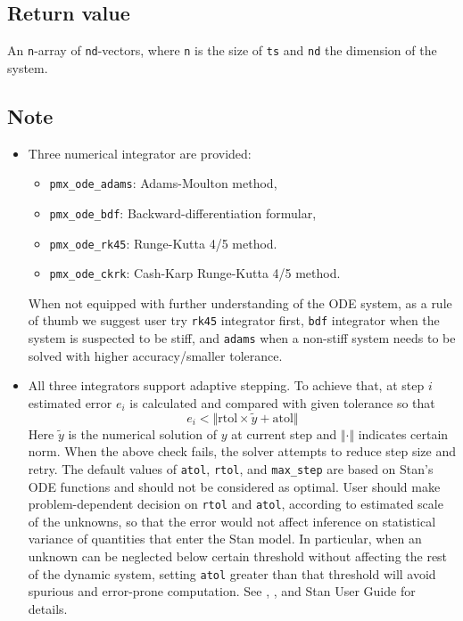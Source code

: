 \documentclass[12pt, reqno, oneside]{amsbook}
\numberwithin{equation}{chapter}
\numberwithin{figure}{chapter}
\numberwithin{table}{chapter}
\theoremstyle{remark}
\begin{document}
\subsection{Return value}
\label{sec:org0bffd09}
An \texttt{n}-array of \texttt{nd}-vectors, where \texttt{n} is the size of \texttt{ts}
and \texttt{nd} the dimension of the system.
\subsection{Note}
\label{sec:orgf701db1}
\begin{itemize}
\item Three numerical integrator are provided:
\begin{itemize}
\item \texttt{pmx\_ode\_adams}: Adams-Moulton method,
\item \texttt{pmx\_ode\_bdf}: Backward-differentiation formular,
\item \texttt{pmx\_ode\_rk45}: Runge-Kutta 4/5 method.
\item \texttt{pmx\_ode\_ckrk}: Cash-Karp Runge-Kutta 4/5 method.
\end{itemize}
When not equipped with further understanding of the ODE system, as a
rule of thumb we suggest user try
\texttt{rk45} integrator first, \texttt{bdf}
integrator when the system is suspected to be stiff, and
\texttt{adams} when a non-stiff system needs to be solved
with higher accuracy/smaller tolerance.

\item All three integrators support adaptive stepping. To achieve
that, at step \(i\) estimated error \(e_i\) is calculated and
compared with given tolerance so that
\begin{equation}
  e_i < \Vert\text{rtol} \times \tilde{y} + \text{atol}\Vert
\end{equation}
Here \(\tilde{y}\) is the numerical solution of \(y\) at current
step and \(\Vert \cdot \Vert\) indicates certain norm. When the above check fails, the solver attempts
to reduce step size and retry. The default values of \texttt{atol},
\texttt{rtol}, and \texttt{max\_step} are
based on Stan's ODE functions and should not be considered as
optimal. User should make problem-dependent
decision on \texttt{rtol} and \texttt{atol},
according to estimated scale of the unknowns, so that the error
would not affect inference on statistical variance of quantities
that enter the Stan model. In particular, when an unknown can be neglected
below certain threshold without affecting the rest of
the dynamic system, setting
\texttt{atol} greater than that threshold will avoid
spurious and error-prone computation. See
\cite{hindmarsh_cvodes_2020}, \cite[Chap~1.4]{shampine_solving_2003}, and Stan User Guide for details.
\end{itemize}
\end{document}

